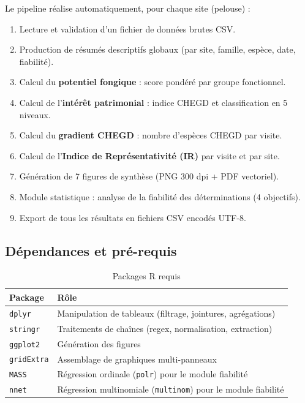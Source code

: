 \documentclass[11pt,a4paper]{article}
\begin{document}
Le pipeline réalise automatiquement, pour chaque site (pelouse) :

\begin{enumerate}[label=\arabic*.]
  \item Lecture et validation d'un fichier de données brutes CSV.
  \item Production de résumés descriptifs globaux (par site, famille, espèce, date, fiabilité).
  \item Calcul du \textbf{potentiel fongique} : score pondéré par groupe fonctionnel.
  \item Calcul de l'\textbf{intérêt patrimonial} : indice CHEGD et classification en 5 niveaux.
  \item Calcul du \textbf{gradient CHEGD} : nombre d'espèces CHEGD par visite.
  \item Calcul de l'\textbf{Indice de Représentativité (IR)} par visite et par site.
  \item Génération de 7 figures de synthèse (PNG 300 dpi + PDF vectoriel).
  \item Module statistique : analyse de la fiabilité des déterminations (4 objectifs).
  \item Export de tous les résultats en fichiers CSV encodés UTF-8.
\end{enumerate}

\subsection{Dépendances et pré-requis}

\begin{table}[htbp]
  \centering
  \caption{Packages R requis}
  \begin{tabularx}{\textwidth}{lX}
    \toprule
    \textbf{Package} & \textbf{Rôle} \\
    \midrule
    \texttt{dplyr}     & Manipulation de tableaux (filtrage, jointures, agrégations) \\
    \texttt{stringr}   & Traitements de chaînes (regex, normalisation, extraction) \\
    \texttt{ggplot2}   & Génération des figures \\
    \texttt{gridExtra} & Assemblage de graphiques multi-panneaux \\
    \texttt{MASS}      & Régression ordinale (\texttt{polr}) pour le module fiabilité \\
    \texttt{nnet}      & Régression multinomiale (\texttt{multinom}) pour le module fiabilité \\
    \bottomrule
  \end{tabularx}
\end{table}
\end{document}
